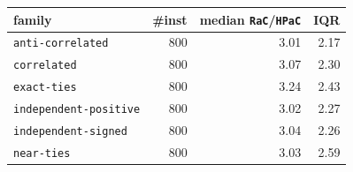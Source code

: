 \begin{tabular}{@{}lrrr@{}}
\toprule
family & \#inst & median \texttt{RaC}/\texttt{HPaC} & IQR \\
\midrule
\texttt{anti-correlated} & 800 & 3.01 & 2.17 \\
\texttt{correlated} & 800 & 3.07 & 2.30 \\
\texttt{exact-ties} & 800 & 3.24 & 2.43 \\
\texttt{independent-positive} & 800 & 3.02 & 2.27 \\
\texttt{independent-signed} & 800 & 3.04 & 2.26 \\
\texttt{near-ties} & 800 & 3.03 & 2.59 \\
\bottomrule
\end{tabular}
